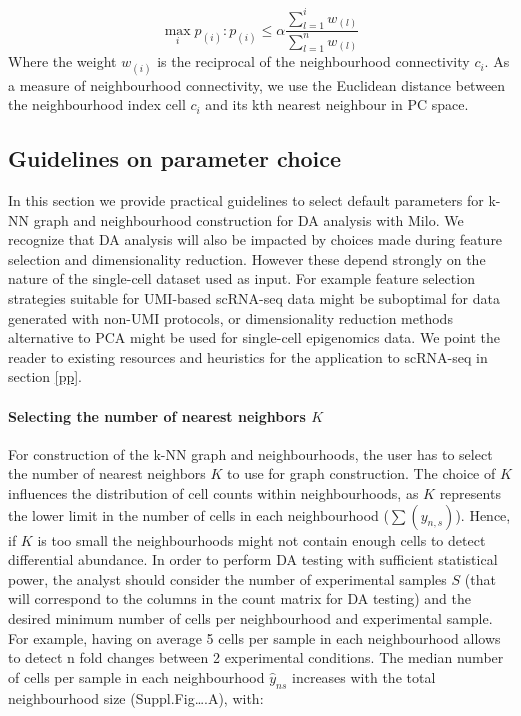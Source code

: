 \documentclass[
]{article}
\begin{document}
\[
\max_i{p_{(i)}: p_{(i)}\le \alpha\frac{\sum_{l=1}^{i}w_{(l)}}{\sum_{l=1}^{n}w_{(l)}}}
\]
Where the weight \(w_{(i)}\) is the reciprocal of the neighbourhood connectivity \(c_i\). As a measure of neighbourhood connectivity, we use the Euclidean distance between the neighbourhood index cell \(c_i\) and its kth nearest neighbour in PC space.

\hypertarget{guidelines-on-parameter-choice}{%
\subsection{Guidelines on parameter choice}\label{guidelines-on-parameter-choice}}

In this section we provide practical guidelines to select default parameters for k-NN graph and neighbourhood construction for DA analysis with Milo. We recognize that DA analysis will also be impacted by choices made during feature selection and dimensionality reduction. However these depend strongly on the nature of the single-cell dataset used as input. For example feature selection strategies suitable for UMI-based scRNA-seq data might be suboptimal for data generated with non-UMI protocols, or dimensionality reduction methods alternative to PCA might be used for single-cell epigenomics data. We point the reader to existing resources and heuristics for the application to scRNA-seq in section \ref{pp}.

\hypertarget{selecting-the-number-of-nearest-neighbors-k}{%
\paragraph*{\texorpdfstring{Selecting the number of nearest neighbors \(K\)}{Selecting the number of nearest neighbors K}}\label{selecting-the-number-of-nearest-neighbors-k}}

For construction of the k-NN graph and neighbourhoods, the user has to select the number of nearest neighbors \(K\) to use for graph construction.
The choice of \(K\) influences the distribution of cell counts within neighbourhoods, as \(K\) represents the lower limit in the number of cells in each neighbourhood (\(\sum(y_{n,s})\)). Hence, if \(K\) is too small the neighbourhoods might not contain enough cells to detect differential abundance. In order to perform DA testing with sufficient statistical power, the analyst should consider the number of experimental samples \(S\) (that will correspond to the columns in the count matrix for DA testing) and the desired minimum number of cells per neighbourhood and experimental sample. For example, having on average 5 cells per sample in each neighbourhood allows to detect n fold changes between 2 experimental conditions.
The median number of cells per sample in each neighbourhood \(\hat{y}_{ns}\) increases with the total neighbourhood size (Suppl.Fig\ldots.A), with:
\end{document}

